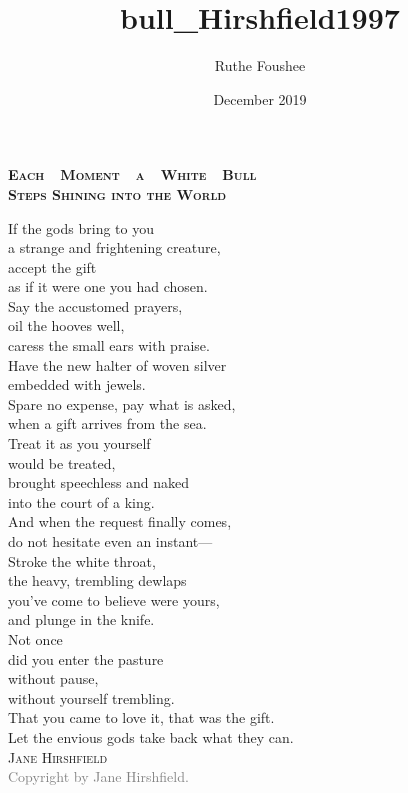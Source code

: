 \documentclass[12pt]{memoir}
\title{bull_Hirshfield1997}
\author{Ruthe Foushee}
\date{December 2019}
\begin{document}
\thispagestyle{empty}
\noindent \textbf{\large \textsc{Each~~Moment~~a~~White~~Bull\\ Steps Shining into the World}}
\vspace{32pt}

\noindent If the gods bring to you\\
a strange and frightening creature,\\
accept the gift\\
as if it were one you had chosen.\\

\noindent Say the accustomed prayers,\\
oil the hooves well,\\
caress the small ears with praise.\\

\noindent Have the new halter of woven silver\\
embedded with jewels.\\
Spare no expense, pay what is asked,\\
when a gift arrives from the sea.\\

\noindent Treat it as you yourself\\
would be treated,\\
brought speechless and naked\\
into the court of a king.\\

\noindent And when the request finally comes,\\
do not hesitate even an instant---\\

\noindent Stroke the white throat,\\
the heavy, trembling dewlaps\\
you've come to believe were yours,\\
and plunge in the knife.\\

\noindent Not once\\
did you enter the pasture\\
without pause,\\
without yourself trembling.\\
That you came to love it, that was the gift.\\

\noindent Let the envious gods take back what they can.\\

\vspace{30pt}
\hspace{103pt} \textsc{Jane Hirshfield}\\
\vfill
\noindent\textcolor{gray}{\footnotesize Copyright  by Jane Hirshfield.}
\end{document}
